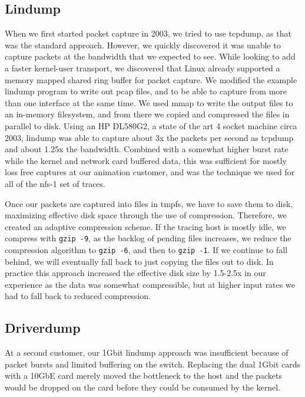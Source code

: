 \subsection{Lindump}

When we first started packet capture in 2003, we tried to use tcpdump,
as that was the standard approach.  However, we quickly discovered it
was unable to capture packets at the bandwidth that we expected to
see.  While looking to add a faster kernel-user transport, we
discovered that Linux already supported a memory mapped shared ring
buffer for packet capture. We modified the example lindump program to
write out pcap files, and to be able to capture from more than one
interface at the same time.  We used mmap to write the output files to
an in-memory filesystem, and from there we copied and compressed the
files in parallel to disk.  Using an HP DL580G2, a state of the art
4 socket machine circa 2003, lindump was able to capture about 3x the
packets per second as tcpdump and about 1.25x the bandwidth.  Combined
with a somewhat higher burst rate while the kernel and network card
buffered data, this was sufficient for mostly loss free captures at
our animation customer, and was the technique we used for all of the
nfs-1 set of traces.

Once our packets are captured into files in tmpfs, we have to save
them to disk, maximizing effective disk space through the use of
compression.  Therefore, we created an adaptive compression scheme.
If the tracing host is mostly idle, we compress with {\tt gzip -9}, as
the backlog of pending files increases, we reduce the compression
algorithm to {\tt gzip -6}, and then to {\tt gzip -1}.  If we continue
to fall behind, we will eventually fall back to just copying the files
out to disk.  In practice this approach increased the effective disk
size by 1.5-2.5x in our experience as the data was somewhat
compressible, but at higher input rates we had to fall back to reduced
compression.

\subsection{Driverdump}

At a second customer, our 1Gbit lindump approach was insufficient
because of packet bursts and limited buffering on the switch.
Replacing the dual 1Gbit cards with a 10GbE card merely moved the
bottleneck to the host and the packets would be dropped on the card
before they could be consumed by the kernel.

